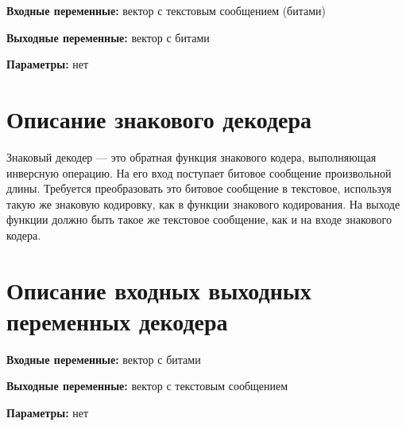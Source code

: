 \textbf{Входные переменные:}  вектор с текстовым сообщением (битами)

\textbf{Выходные переменные:} вектор с битами

\textbf{Параметры:} нет


\section{Описание знакового декодера}
Знаковый декодер — это обратная функция знакового кодера, выполняющая инверсную операцию. 
На его вход поступает битовое сообщение произвольной длины. Требуется преобразовать это битовое сообщение в текстовое, 
используя такую же знаковую кодировку, как в функции
знакового кодирования. На выходе функции должно быть такое же текстовое сообщение, как и на входе знакового кодера.

\noindent
[\dotfill]

\section{Описание входных выходных переменных декодера}

\textbf{Входные переменные:}  вектор с битами

\textbf{Выходные переменные:} вектор с текстовым сообщением

\textbf{Параметры:} нет

\endinput 